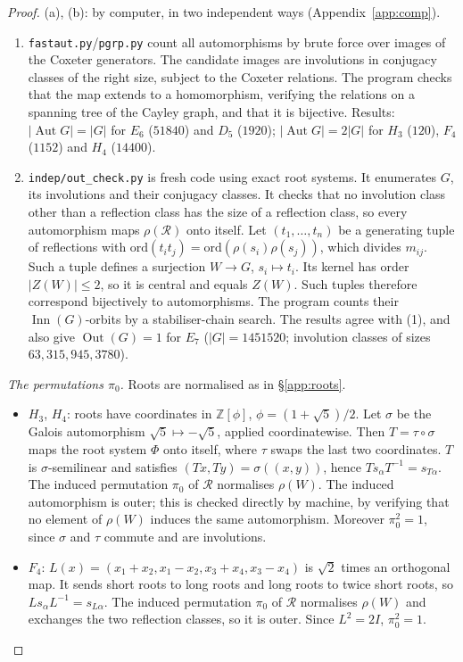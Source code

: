 \documentclass[11pt]{amsart}
\theoremstyle{definition}
\newcommand{\Z}{\mathbb{Z}}
\newcommand{\R}{\mathcal{R}}
\newcommand{\Aut}{\operatorname{Aut}}
\newcommand{\Out}{\operatorname{Out}}
\newcommand{\Inn}{\operatorname{Inn}}
\begin{document}
\begin{proof}
(a), (b): by computer, in two independent ways (Appendix~\ref{app:comp}).
\begin{enumerate}[label=(\arabic*)]
\item \texttt{fastaut.py}/\texttt{pgrp.py} count all automorphisms by brute force over images of the Coxeter
generators. The candidate images are involutions in conjugacy classes of the right size, subject to the Coxeter
relations. The program checks that the map extends to a homomorphism, verifying the relations on a spanning tree
of the Cayley graph, and that it is bijective. Results: $|\Aut G|=|G|$ for $E_6$ ($51840$) and $D_5$ ($1920$);
$|\Aut G|=2|G|$ for $H_3$ ($120$), $F_4$ ($1152$) and $H_4$ ($14400$).
\item \texttt{indep/out\_check.py} is fresh code using exact root systems. It enumerates $G$, its involutions and
their conjugacy classes. It checks that no involution class other than a reflection class has the size of a
reflection class, so every automorphism maps $\rho(\R)$ onto itself. Let $(t_1,\dots,t_n)$ be a generating tuple of reflections with
$\mathrm{ord}(t_it_j)=\mathrm{ord}(\rho(s_i)\rho(s_j))$, which divides $m_{ij}$. Such a tuple defines a surjection
$W\to G$, $s_i\mapsto t_i$. Its kernel has order $|Z(W)|\le 2$, so it is
central and equals $Z(W)$. Such tuples therefore correspond bijectively to automorphisms. The program counts their
$\Inn(G)$-orbits by a stabiliser-chain search. The results agree with (1), and also give $\Out(G)=1$ for $E_7$
($|G|=1451520$; involution classes of sizes $63,315,945,3780$).
\end{enumerate}

\emph{The permutations $\pi_0$.} Roots are normalised as in \S\ref{app:roots}.
\begin{itemize}
\item $H_3$, $H_4$: roots have coordinates in $\Z[\phi]$, $\phi=(1+\sqrt5)/2$. Let $\sigma$ be the Galois
automorphism $\sqrt5\mapsto-\sqrt5$, applied coordinatewise. Then $T=\tau\circ\sigma$ maps the root system $\Phi$
onto itself, where $\tau$ swaps the last two coordinates. $T$ is $\sigma$-semilinear and satisfies
$(Tx,Ty)=\sigma((x,y))$, hence $Ts_\alpha T^{-1}=s_{T\alpha}$. The induced permutation $\pi_0$ of $\R$ normalises
$\rho(W)$. The induced automorphism is outer; this is checked directly by machine, by verifying that no element of
$\rho(W)$ induces the same automorphism. Moreover $\pi_0^2=1$, since $\sigma$ and $\tau$ commute and are involutions.
\item $F_4$: $L(x)=(x_1+x_2,x_1-x_2,x_3+x_4,x_3-x_4)$ is $\sqrt2$ times an orthogonal map. It sends short roots to
long roots and long roots to twice short roots, so $Ls_\alpha L^{-1}=s_{L\alpha}$. The induced permutation $\pi_0$
of $\R$ normalises $\rho(W)$ and exchanges the two reflection classes, so it is outer. Since $L^2=2I$, $\pi_0^2=1$.
\end{itemize}


\end{proof}
\end{document}

